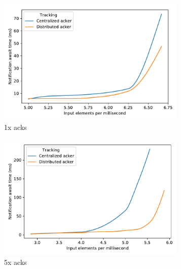 \begin{figure}[t!]
    \begin{subfigure}[b]{0.32\textwidth}
            \includegraphics[width=0.99\textwidth]{pics/scalability_01x.pdf}
            \caption{1x acks}
            \label{1x_acks}
    \end{subfigure}
    \hspace{5mm}
    \begin{subfigure}[b]{0.32\textwidth}
            \includegraphics[width=0.99\textwidth]{pics/scalability_05x.pdf}
            \caption{5x acks}
            \label{5x_acks}
    \end{subfigure}
    \hspace{5mm}
    \begin{subfigure}[b]{0.32\textwidth}

\end{subfigure}
\end{figure}

